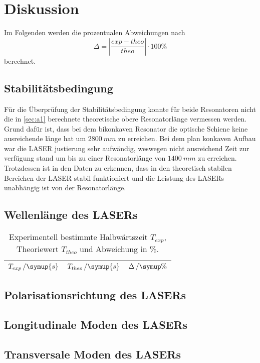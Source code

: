 \section{Diskussion}
\label{sec:Diskussion}
Im Folgenden werden die prozentualen Abweichungen nach
\begin{equation}\label{eq:1}
    \Delta = |\frac{exp - theo}{theo}|\cdot 100\%
\end{equation}
berechnet.

%        

\subsection{Stabilitätsbedingung}
Für die Überprüfung der Stabilitätsbedingung konnte für beide Resonatoren nicht die in \autoref{sec:a1} berechnete theoretische obere Resonatorlänge vermessen werden. Grund dafür ist, dass bei dem bikonkaven Resonator die optische Schiene keine ausreichende länge hat um $\SI{2800}{mm}$ zu erreichen. Bei dem plan konkaven Aufbau war die LASER justierung sehr aufwändig, weswegen nicht ausreichend Zeit zur verfügung stand um bis zu einer Resonatorlänge von $\SI{1400}{mm}$ zu erreichen.
Trotzdessen ist in den Daten zu erkennen, dass in den theoretisch stabilen Bereichen der LASER stabil funktioniert und die Leistung des LASERs unabhängig ist von der Resonatorlänge. 
\subsection{Wellenlänge des LASERs}
\begin{table}[H]
    \centering
    \caption{Experimentell bestimmte Halbwärtszeit $T_{exp}$, Theoriewert $T_{theo}$ und Abweichung in \%.}
    \begin{tabular}{c c c}
        \toprule
        {$T_{exp}\,/\symup{s}$} & {$T_{theo}\,/\symup{s}$} & {$\Delta\,/\symup{\%}$}\\
        \midrule
        
        \bottomrule
    \end{tabular}
    \label{tab:Diskussion}
\end{table}
\subsection{Polarisationsrichtung des LASERs}
\subsection{Longitudinale Moden des LASERs}
\subsection{Transversale Moden des LASERs}
\newpage